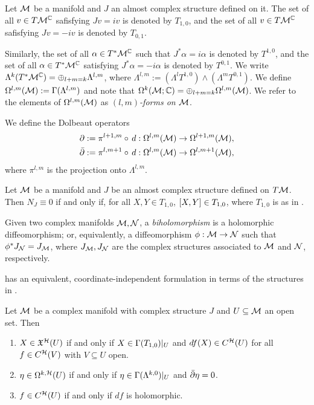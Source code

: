 \documentclass[notas.tex]{subfiles}
\begin{document}
\begin{defn}\label{def_cstruct_constructions}
	Let $\mathcal{M}$ be a manifold and $J$ an almost complex structure defined on it. The set of all $v \in T\mathcal{M}^{\mathbb{C}}$ safisfying $Jv = iv$ is denoted by $T_{1,0}$, and the set of all $v \in T\mathcal{M}^{\mathbb{C}}$ safisfying $Jv = -iv$ is denoted by $T_{0,1}$.	
	
	Similarly, the set of all $\alpha \in T^*\mathcal{M}^{\mathbb{C}}$ such that $J^* \alpha = i \alpha$ is denoted by $T^{1,0}$, and the set of all $\alpha \in T^*\mathcal{M}^{\mathbb{C}}$ satisfying $J^* \alpha = -i \alpha$ is denoted by $T^{0,1}$. We write $\Lambda^k(T^*\mathcal{M}^{\mathbb{C}}) = \oplus_{l+m=k} \Lambda^{l,m}$, where $\Lambda^{l,m}:= (\Lambda^l T^{1,0}) \wedge (\Lambda^m T^{0,1})$. We define $\Omega^{l,m}(\mathcal{M}) := \Gamma(\Lambda^{l,m})$ and note that $\Omega^k(\mathcal{M}; \mathbb{C}) = \oplus_{l+m = k} \Omega^{l,m}(\mathcal{M})$. We refer to the elements of $\Omega^{l,m}(\mathcal{M})$ as \emph{$(l,m)$-forms on $\mathcal{M}$}.
	
	We define the Dolbeaut operators
	\begin{align*}
		\hd&:= \pi^{l+1,m} \circ d: \dform^{l, m}(\mfld) \to \dform^{l+1, m}(\mfld), \\
		\ahd&:= \pi^{l,m+1} \circ d: \dform^{l, m}(\mfld) \to \dform^{l, m+1}(\mfld),
	\end{align*}
	where $\pi^{l,m}$ is the projection onto $\Lambda^{l,m}$.
\end{defn}

\begin{prop}\label{prop_nn_ispace}
	Let $\mathcal{M}$ be a manifold and $J$ be an almost complex structure defined on $T\mathcal{M}$. Then $N_J \equiv 0$ if and only if, for all $X,Y \in T_{1,0}$, $[X,Y] \in T_{1,0}$, where $T_{1,0}$ is as in .
\end{prop}

Given two complex manifolds $\mathcal{M}, \mathcal{N}$, a \emph{biholomorphism} is a holomorphic diffeomorphism; or, equivalently, a diffeomorphism $\phi: \mathcal{M} \to \mathcal{N}$ such that $\phi^*J_{\mathcal{N}} = J_{\mathcal{M}}$, where $J_{\mathcal{M}}, J_{\mathcal{N}}$ are the complex structures associated to $\mathcal{M}$ and $\mathcal{N}$, respectively. 

 has an equivalent, coordinate-independent formulation in terms of the structures in .
\begin{prop}
	Let $\mathcal{M}$ be a complex manifold with complex structure $J$ and $U \subseteq \mathcal{M}$ an open set. Then
	\begin{enumerate}
		\item $X \in \mathfrak{X}^{\mathcal{H}}(U)$ if and only if $X \in \Gamma(T_{1,0})|_U$ and $df(X) \in C^{\mathcal{H}}(U)$ for all $f \in C^{\mathcal{H}}(V)$ with $V \subseteq U$ open.
		\item $\eta \in \Omega^{k, \mathcal{H}}(U)$ if and only if $\eta \in \Gamma(\Lambda^{k,0})|_U$ and $\bar{\partial} \eta = 0$.
		\item $f \in C^{\mathcal{H}}(U)$ if and only if $df$ is holomorphic.
	\end{enumerate}
\end{prop}
\end{document}
